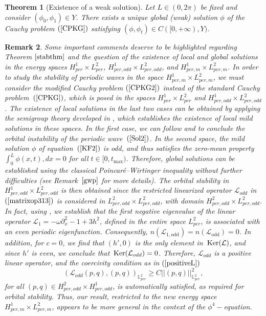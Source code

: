 \documentclass[12pt,reqno,a4paper]{amsart} %
\newcommand{\Ker}{{\rm \,Ker}}
\numberwithin{equation}{section}
\numberwithin{figure}{section}
\newtheorem{theorem}{Theorem}[section]
\newtheorem{remark}[theorem]{Remark}
\begin{document}
\begin{theorem}[Existence of a weak solution]\label{lwpthm2}	
	Let $L\in (0,2\pi)$ be fixed and consider $(\phi_0,\phi_1)\in Y$. There exists a unique  global (weak) solution $\phi$ of the Cauchy problem $(\ref{CPKG})$ satisfying $(\phi,\phi_t)\in C([0,+\infty),Y)$.
\end{theorem}

\begin{remark}\label{gwpstab}
\indent Some important comments deserve to be highlighted regarding Theorem $\ref{stabthm}$ and the question of the existence of local and global solutions in the energy spaces $H_{per}^1 \times L_{per}^2$, $H_{per,odd}^1 \times L_{per,odd}^2$, and $H_{per,m}^1 \times L_{per,m}^2$. In order to study the stability of periodic waves in the space $H_{per,m}^1 \times L_{per,m}^2$, we must consider the modified Cauchy problem $(\ref{CPKG2})$ instead of the standard Cauchy problem~$(\ref{CPKG})$, which is posed in the spaces $H_{per}^1 \times L_{per}^2$ and $H_{per,odd}^1 \times L_{per,odd}^2$. The existence of local solutions in the last two cases can be obtained by applying the semigroup theory developed in \cite{pazy}, which establishes the existence of local mild solutions in these spaces. In the first case, we can follow \cite{loreno} and \cite{palacios} to conclude the orbital instability of the periodic wave~$(\ref{Sol2})$. In the second space, the mild solution $\phi$ of equation~$(\ref{KF2})$ is odd, and thus satisfies the zero-mean property $\int_0^L \phi(x,t), dx = 0$ for all $t \in [0, t_{\max})$. Therefore, global solutions can be established using the classical Poincar\'e–Wirtinger inequality without further difficulties (see Remark~$\ref{gwp}$ for more details). The orbital stability in $H_{per,odd}^1 \times L_{per,odd}^2$ is then obtained since the restricted linearized operator $\mathcal{L}_{odd}$ in $(\ref{matrixop313})$ is considered in $L_{per,odd}^2 \times L_{per,odd}^2$, with domain $H_{per,odd}^2 \times L_{per,odd}^2$. In fact, using \cite[Proposition 3.8]{loreno}, we establish that the first negative eigenvalue of the linear operator $\mathcal{L}_1=-\omega\partial_x^2-1+3h^2$, defined in the entire space $L_{per}^2$, is associated with an even periodic eigenfunction. Consequently, $n(\mathcal{L}_{1,\text{odd}}) = n(\mathcal{L}_{\text{odd}}) = 0$. In addition, for $c = 0$, we find that $(h', 0)$ is the only element in $\Ker(\mathcal{L})$, and since $h'$ is even, we conclude that $\Ker(\mathcal{L}_{odd}) = {0}$. Therefore, $\mathcal{L}_{odd}$ is a positive linear operator, and the coercivity condition as in $(\ref{positiveL})$
\begin{equation}\label{positiveL123}
(\mathcal{L}_{odd}(p,q), (p,q))_{\mathbb{L}_{per}^2} \geq C||(p,q)||_{\mathbb{L}_{per}^2}^2,
\end{equation}
for all $(p,q) \in H_{per,odd}^2 \times H_{per,odd}^1$, is automatically satisfied, as required for orbital stability. Thus, our result, restricted to the new energy space $H_{per,m}^1 \times L_{per,m}^2$, appears to be more general in the context of the $\phi^4-$equation.
\end{remark}
\end{document}
